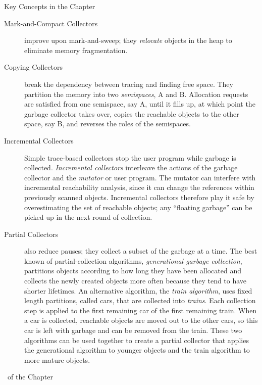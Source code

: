 \begin{bibunit}[apalike]
\begin{frame}[t,allowframebreaks]{Key Concepts in the Chapter}
\begin{small}
\begin{description}
	\item[Mark-and-Compact Collectors] improve upon mark-and-sweep; they \emph{relocate} objects in the heap to eliminate memory fragmentation.
	\item[Copying Collectors] break the dependency between tracing and finding free space. They partition the memory into two \emph{semispaces}, A and B. Allocation requests are satisfied from one semispace, say A, until it fills up, at which point the garbage collector takes over, copies the reachable objects to the other space, say B, and reverses the roles of the semispaces.
	\item[Incremental Collectors] Simple trace-based collectors stop the user program while garbage is collected. \emph{Incremental collectors} interleave the actions of the garbage collector and the \emph{mutator} or user program. The mutator can interfere with incremental reachability analysis, since it can change the references within previously scanned objects. Incremental collectors therefore play it safe by overestimating the set of reachable objects; any ``floating garbage'' can be picked up in the next round of collection.
	\item[Partial Collectors] also reduce pauses; they collect a subset of the garbage at a time. The best known of partial-collection algorithms, \emph{generational garbage collection}, partitions objects according to how long they have been allocated and collects the newly created objects more often because they tend to have shorter lifetimes. An alternative algorithm, the \emph{train algorithm}, uses fixed length partitions, called cars, that are collected into \emph{trains}. Each collection step is applied to the first remaining car of the first remaining train. When a car is collected, reachable objects are moved out to the other cars, so this car is left with garbage and can be removed from the train. These two algorithms can be used together to create a partial collector that applies the generational algorithm to younger objects and the train algorithm to more mature objects.
	\end{description}
	\end{small}
\end{frame}

\begin{frame}[t,allowframebreaks]{\bibname\ of the Chapter}%
	\tiny%
\end{frame}%

\end{bibunit}

